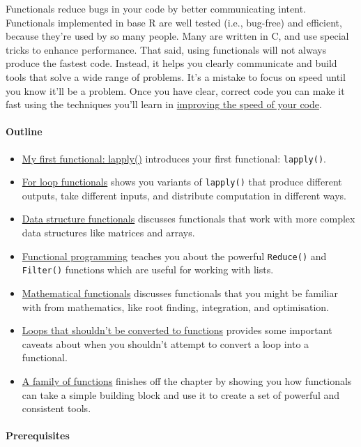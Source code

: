 Functionals reduce bugs in your code by better communicating intent.
Functionals implemented in base R are well tested (i.e., bug-free) and
efficient, because they're used by so many people. Many are written in
C, and use special tricks to enhance performance. That said, using
functionals will not always produce the fastest code. Instead, it helps
you clearly communicate and build tools that solve a wide range of
problems. It's a mistake to focus on speed until you know it'll be a
problem. Once you have clear, correct code you can make it fast using
the techniques you'll learn in \hyperref[profiling]{improving the speed
of your code}.

\paragraph{Outline}

\begin{itemize}
\item
  \hyperref[lapply]{My first functional: lapply()} introduces your first
  functional: \texttt{lapply()}.
\item
  \hyperref[functionals-loop]{For loop functionals} shows you variants
  of \texttt{lapply()} that produce different outputs, take different
  inputs, and distribute computation in different ways.
\item
  \hyperref[functionals-ds]{Data structure functionals} discusses
  functionals that work with more complex data structures like matrices
  and arrays.
\item
  \hyperref[functionals-fp]{Functional programming} teaches you about
  the powerful \texttt{Reduce()} and \texttt{Filter()} functions which
  are useful for working with lists.
\item
  \hyperref[functionals-math]{Mathematical functionals} discusses
  functionals that you might be familiar with from mathematics, like
  root finding, integration, and optimisation.
\item
  \hyperref[functionals-not]{Loops that shouldn't be converted to
  functions} provides some important caveats about when you shouldn't
  attempt to convert a loop into a functional.
\item
  \hyperref[function-family]{A family of functions} finishes off the
  chapter by showing you how functionals can take a simple building
  block and use it to create a set of powerful and consistent tools.
\end{itemize}

\paragraph{Prerequisites}

